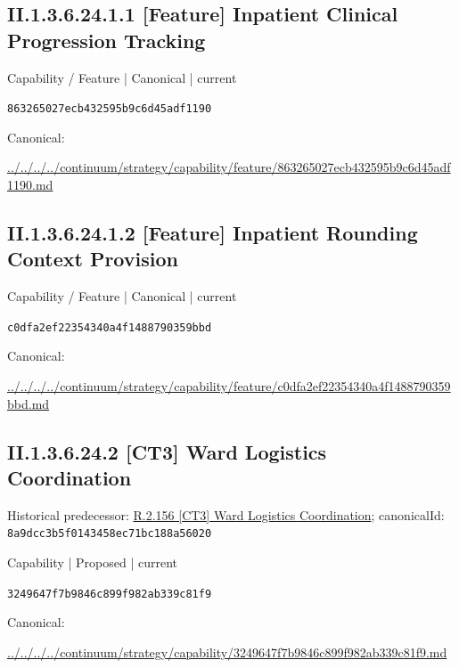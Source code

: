 \documentclass[10pt,a4paper]{article}
\begin{document}
\subsection*{II.1.3.6.24.1.1 [Feature] Inpatient Clinical Progression Tracking}
\label{element-863265027ecb432595b9c6d45adf1190}
{\small Capability / Feature | Canonical | current}\par
\texttt{863265027ecb432595b9c6d45adf1190}\par
Canonical: \par
{\footnotesize\url{../../../../continuum/strategy/capability/feature/863265027ecb432595b9c6d45adf1190.md}}\par
\subsection*{II.1.3.6.24.1.2 [Feature] Inpatient Rounding Context Provision}
\label{element-c0dfa2ef22354340a4f1488790359bbd}
{\small Capability / Feature | Canonical | current}\par
\texttt{c0dfa2ef22354340a4f1488790359bbd}\par
Canonical: \par
{\footnotesize\url{../../../../continuum/strategy/capability/feature/c0dfa2ef22354340a4f1488790359bbd.md}}\par
\subsection*{II.1.3.6.24.2 [CT3] Ward Logistics Coordination}
Historical predecessor: \hyperref[element-8a9dcc3b5f0143458ec71bc188a56020]{R.2.156 [CT3] Ward Logistics Coordination}; canonicalId: \texttt{8a9dcc3b5f0143458ec71bc188a56020}\par
\label{element-3249647f7b9846c899f982ab339c81f9}
{\small Capability | Proposed | current}\par
\texttt{3249647f7b9846c899f982ab339c81f9}\par
Canonical: \par
{\footnotesize\url{../../../../continuum/strategy/capability/3249647f7b9846c899f982ab339c81f9.md}}\par
\end{document}

